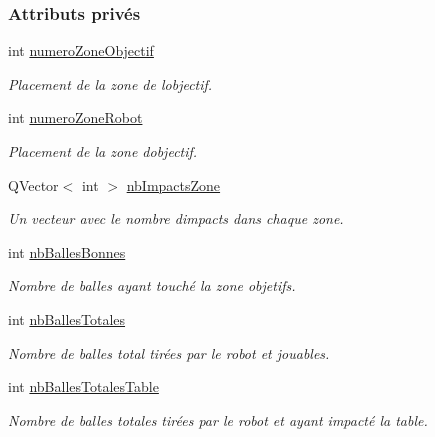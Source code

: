 \subsubsection*{Attributs privés}
\begin{DoxyCompactItemize}
\item 
int \hyperlink{class_statistiques_seance_a23226867e4a34cb41f8c07f3d8d42e49}{numero\+Zone\+Objectif}
\begin{DoxyCompactList}\small\item\em Placement de la zone de l\textquotesingle{}objectif. \end{DoxyCompactList}\item 
int \hyperlink{class_statistiques_seance_aeea50e7fc9b2308e365f77f27e3f86ee}{numero\+Zone\+Robot}
\begin{DoxyCompactList}\small\item\em Placement de la zone d\textquotesingle{}objectif. \end{DoxyCompactList}\item 
Q\+Vector$<$ int $>$ \hyperlink{class_statistiques_seance_aa4a040cda282d5b1c250025f8e191e20}{nb\+Impacts\+Zone}
\begin{DoxyCompactList}\small\item\em Un vecteur avec le nombre d\textquotesingle{}impacts dans chaque zone. \end{DoxyCompactList}\item 
int \hyperlink{class_statistiques_seance_af62043be598fd6b7cd7ddbc37eadf967}{nb\+Balles\+Bonnes}
\begin{DoxyCompactList}\small\item\em Nombre de balles ayant touché la zone objetifs. \end{DoxyCompactList}\item 
int \hyperlink{class_statistiques_seance_a27eb3965bbe304700d3254534c5e4ed3}{nb\+Balles\+Totales}
\begin{DoxyCompactList}\small\item\em Nombre de balles total tirées par le robot et jouables. \end{DoxyCompactList}\item 
int \hyperlink{class_statistiques_seance_aa152a6f154cc832c3355342ecf94162a}{nb\+Balles\+Totales\+Table}
\begin{DoxyCompactList}\small\item\em Nombre de balles totales tirées par le robot et ayant impacté la table. \end{DoxyCompactList}\item 

\end{DoxyCompactItemize}
